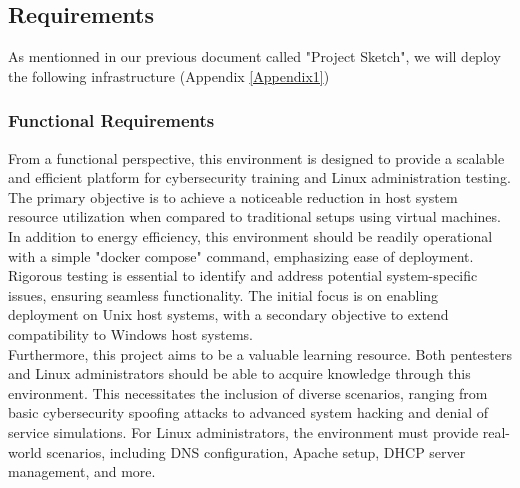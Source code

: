 \documentclass[a4paper,11pt,singlespacing]{article}
\begin{document}
\newpage

\subsection{Requirements}
As mentionned in our previous document called "Project Sketch", we will deploy the following infrastructure (Appendix \ref{Appendix1})

\subsubsection{Functional Requirements}
From a functional perspective, this environment is designed to provide a scalable and efficient platform for cybersecurity training and Linux administration testing. The primary objective is to achieve a noticeable reduction in host system resource utilization when compared to traditional setups using virtual machines.\\

In addition to energy efficiency, this environment should be readily operational with a simple "docker compose" command, emphasizing ease of deployment. Rigorous testing is essential to identify and address potential system-specific issues, ensuring seamless functionality. The initial focus is on enabling deployment on Unix host systems, with a secondary objective to extend compatibility to Windows host systems.\\

Furthermore, this project aims to be a valuable learning resource. Both pentesters and Linux administrators should be able to acquire knowledge through this environment. This necessitates the inclusion of diverse scenarios, ranging from basic cybersecurity spoofing attacks to advanced system hacking and denial of service simulations. For Linux administrators, the environment must provide real-world scenarios, including DNS configuration, Apache setup, DHCP server management, and more.\\
\end{document}
